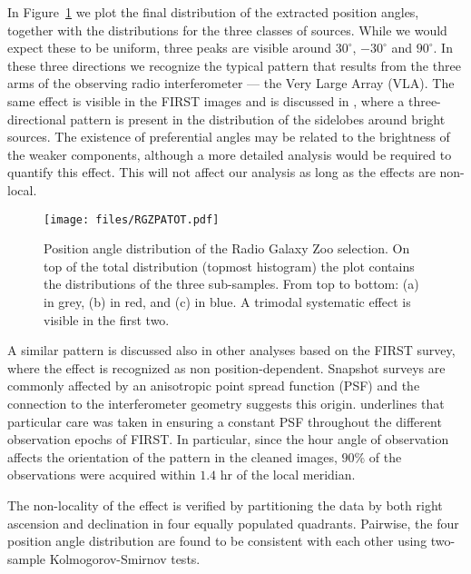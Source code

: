             In Figure~\ref{fig:RGZPAdist} we plot the final distribution of the extracted position angles, together with the distributions for the three classes of sources. While we would expect these to be uniform, three peaks are visible around $30^\circ$, $-30^\circ$ and $90^\circ$. In these three directions we recognize the typical pattern that results from the three arms of the observing radio interferometer --- the Very Large Array (VLA). The same effect is visible in the FIRST images and is discussed in \cite{Helfand2015b}, where a three-directional pattern is present in the distribution of the sidelobes around bright sources. The existence of preferential angles may be related to the brightness of the weaker components, although a more detailed analysis would be required to quantify this effect. This will not affect our analysis as long as the effects are non-local.

			\begin{figure}
				\centering
				\texttt{[image: files/RGZPATOT.pdf]}
				\caption{Position angle distribution of the Radio Galaxy Zoo selection. On top of the total distribution (topmost histogram) the plot contains the distributions of the three sub-samples. From top to bottom: (a) in grey, (b) in red, and (c) in blue. A trimodal systematic effect is visible in the first two.}
				
				\label{fig:RGZPAdist}
			\end{figure}

            A similar pattern is discussed also in other analyses \citep[e.g.,][]{Chang2004, White2007, Demetroullas2015} based on the FIRST survey, where the effect is recognized as non position-dependent. Snapshot surveys are commonly affected by an anisotropic point spread function (PSF) and the connection to the interferometer geometry suggests this origin.
            \cite{Helfand2015b} underlines that particular care was taken in ensuring a constant PSF throughout the different observation epochs of FIRST. In particular, since the hour angle of observation affects the orientation of the pattern in the cleaned images, $90\%$ of the observations were acquired within $1.4$ hr of the local meridian.	
			
			The non-locality of the effect is verified by partitioning the data by both right ascension and declination in four equally populated quadrants. Pairwise, the four position angle distribution are found to be consistent with each other using two-sample Kolmogorov-Smirnov tests. 
            
